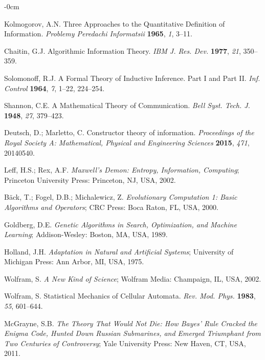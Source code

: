 \documentclass[entropy,article,submit,pdftex,moreauthors]{Definitions/mdpi}
\begin{document}
\begin{adjustwidth}{-\extralength}{0cm}
\begin{thebibliography}{999}
Kolmogorov, A.N. Three Approaches to the Quantitative Definition of Information. \textit{Problemy Peredachi Informatsii} \textbf{1965}, \textit{1}, 3–11.

Chaitin, G.J. Algorithmic Information Theory. \textit{IBM J. Res. Dev.} \textbf{1977}, \textit{21}, 350–359. 

Solomonoff, R.J. A Formal Theory of Inductive Inference. Part I and Part II. \textit{Inf. Control} \textbf{1964}, \textit{7}, 1–22, 224–254.

Shannon, C.E. A Mathematical Theory of Communication. \textit{Bell Syst. Tech. J.} \textbf{1948}, \textit{27}, 379–423.

Deutsch, D.; Marletto, C. Constructor theory of information. \textit{Proceedings of the Royal Society A: Mathematical, Physical and Engineering Sciences} \textbf{2015}, \textit{471}, 20140540. 

Leff, H.S.; Rex, A.F. \textit{Maxwell’s Demon: Entropy, Information, Computing}; Princeton University Press: Princeton, NJ, USA, 2002.

Bäck, T.; Fogel, D.B.; Michalewicz, Z. \textit{Evolutionary Computation 1: Basic Algorithms and Operators}; CRC Press: Boca Raton, FL, USA, 2000.

Goldberg, D.E. \textit{Genetic Algorithms in Search, Optimization, and Machine Learning}; Addison-Wesley: Boston, MA, USA, 1989.

Holland, J.H. \textit{Adaptation in Natural and Artificial Systems}; University of Michigan Press: Ann Arbor, MI, USA, 1975.

Wolfram, S. \textit{A New Kind of Science}; Wolfram Media: Champaign, IL, USA, 2002.

Wolfram, S. Statistical Mechanics of Cellular Automata. \textit{Rev. Mod. Phys.} \textbf{1983}, \textit{55}, 601–644.

McGrayne, S.B. \textit{The Theory That Would Not Die: How Bayes' Rule Cracked the Enigma Code, Hunted Down Russian Submarines, and Emerged Triumphant from Two Centuries of Controversy}; Yale University Press: New Haven, CT, USA, 2011.


\end{thebibliography}
\end{adjustwidth}
\end{document}
